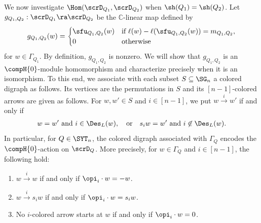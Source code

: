 \documentclass[12pt, reqno]{amsart}
\theoremstyle{plain}
\theoremstyle{definition}
\numberwithin{equation}{section}
\numberwithin{figure}{section}
\numberwithin{table}{section}
\def\C{\mathbb C}
\begin{document}
We now investigate $\Hom(\scrD_{Q_1}, \scrD_{Q_2})$ when $\sh(Q_1) = \sh(Q_2)$.
Let $g_{Q_1, Q_2}: \scrD_{Q_1} \ra \scrD_{Q_2}$ be the $\C$-linear map defined by
\[
g_{Q_1, Q_2}(w)
=
\begin{cases}
\sfu_{Q_1,Q_2}(w)
& \text{if }
\ell(w)-\ell(\sfu_{Q_1,Q_2}(w)) = m_{Q_1,Q_2},\\
0
& \text{otherwise}
\end{cases}
\]
for $w \in \Gamma_{Q_1}$.
By definition, $g_{Q_1, Q_2}$ is nonzero.
We will show that $g_{Q_1,Q_2}$ is an $\compH{0}$-module homomorphism and characterize precisely when it is an isomorphism.
To this end, we associate with each subset $S\subseteq \SG_n$ a colored digraph as follows.
Its vertices are the permutations in $S$ and its $[n-1]$-colored arrows are given as follows. 
For $w,w'\in S$ and $i\in[n-1]$, we put $w\overset{i}{\longrightarrow}w'$ if and only if
\begin{align}\label{eq: colored digraph str def}
w=w' \text{ and } i\in\Des_L(w),
\quad\text{or}\quad  s_iw=w' \text{ and } i \not\in \Des_L(w).
\end{align}
In particular, for $Q\in\SYT_n$, the colored digraph associated with
$\Gamma_Q$ encodes the $\compH{0}$-action on $\scrD_Q$.
More precisely, for $w\in\Gamma_Q$ and
$i\in[n-1]$, the following hold:
\begin{enumerate}[label={\bf E\arabic*.}]
\item $w\overset{i}{\longrightarrow}w$ if and only if
$\opi_i\cdot w=-w$.
\item $w\overset{i}{\longrightarrow}s_i w$ if and only if
$\opi_i\cdot w=s_i w$.
\item No $i$-colored arrow starts at $w$ if and only if
$\opi_i\cdot w = 0$.
\end{enumerate}
\end{document}
